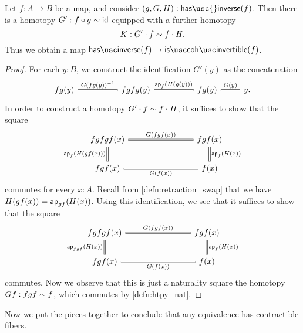 \begin{lem}\label{lem:coherently-invertible}
  Let $f:A\to B$ be a map, and consider $(g,G,H):\mathsf{has\usc{}inverse}(f)$. Then there is a homotopy $G':f\circ g\sim \mathsf{id}_{}$ equipped with a further homotopy
  \begin{equation*}
    K : G'\cdot f \sim f\cdot H.
  \end{equation*}
  Thus we obtain a map $\hasinverse(f)\to\iscohinvertible(f)$.
\end{lem}

\begin{proof}
  For each $y:B$, we construct the identification $G'(y)$ as the concatenation
  \begin{equation*}
    \begin{tikzcd}
      fg(y) \arrow[r,equals,"{G(fg(y))}^{-1}"] &[2.5em] fgfg(y) \arrow[r,equals,"\ap{f}{H(g(y))}"] &[2.5em] fg(y) \arrow[r,equals,"G(y)"] & y.
\end{tikzcd}
  \end{equation*}
  In order to construct a homotopy $G'\cdot f\sim f\cdot H$, it suffices to show that the square
  \begin{equation*}
    \begin{tikzcd}[column sep=8em]
      fgfgf(x) \arrow[r,equals,"{G(fgf(x))}"] \arrow[d,equals,swap,"\ap{f}{H(gf(x))}"] & fgf(x) \arrow[d,equals,"\ap{f}{H(x)}"] \\
      fgf(x) \arrow[r,equals,swap,"G(f(x))"] & f(x)
    \end{tikzcd}
  \end{equation*}
  commutes for every $x:A$.
  Recall from \cref{defn:retraction_swap} that we have $H(gf(x))=\mathsf{ap}_{gf}({H(x)})$. Using this identification, we see that it suffices to show that the square
  \begin{equation*}
    \begin{tikzcd}[column sep=8em]
      fgfgf(x) \arrow[r,equals,"G(fgf(x))"] \arrow[d,equals,swap,"\ap{fgf}{H(x)}"] & fgf(x) \arrow[d,equals,"\ap{f}{H(x)}"] \\
      fgf(x) \arrow[r,equals,swap,"G(f(x))"] & f(x)
    \end{tikzcd}
  \end{equation*}
  commutes. Now we observe that this is just a naturality square the homotopy $Gf:fgf\sim f$, which commutes by \cref{defn:htpy_nat}.
\end{proof}

Now we put the pieces together to conclude that any equivalence has contractible fibers.

